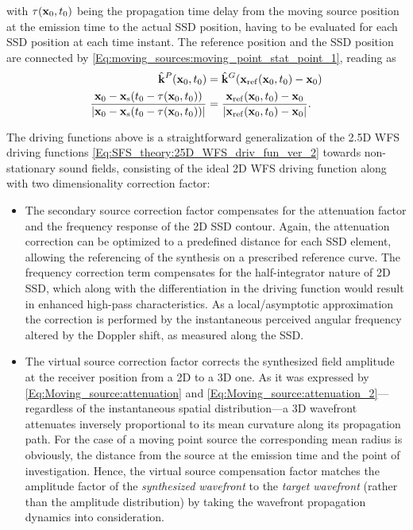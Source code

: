 with $\tau(\mathbf{x}_0,t_0)$ being the propagation time delay from the moving source position at the emission time to the actual SSD position, having to be evaluated for each SSD position at each time instant.
The reference position and the SSD position are connected by \eqref{Eq:moving_sources:moving_point_stat_point_1}, reading as
\begin{align}
\label{Eq:SFS_theory:25D_WFS_ref_point}
\hat{\mathbf{k}}^P(\mathbf{x}_0,t_0) &= \hat{\mathbf{k}}^G(\mathbf{x}_{\mathrm{ref}}(\mathbf{x}_0,t_0)-\mathbf{x}_0)
\\
\frac{\mathbf{x}_0 -\mathbf{x}_{\mathrm{s}}(t_0-\tau(\mathbf{x}_0,t_0))}{|\mathbf{x}_0-\mathbf{x}_{\mathrm{s}}(t_0 - \tau(\mathbf{x}_0,t_0))|} &=  \frac{\mathbf{x}_{\mathrm{ref}}(\mathbf{x}_0,t_0)-\mathbf{x}_0}{|\mathbf{x}_{\mathrm{ref}}(\mathbf{x}_0,t_0)-\mathbf{x}_0|}.
\end{align}

The driving functions above is a straightforward generalization of the 2.5D WFS driving functions \eqref{Eq:SFS_theory:25D_WFS_driv_fun_ver_2} towards non-stationary sound fields, consisting of the ideal 2D WFS driving function along with two dimensionality correction factor:
\begin{itemize}
\item The secondary source correction factor compensates for the attenuation factor and the frequency response of the 2D SSD contour.
Again, the attenuation correction can be optimized to a predefined distance for each SSD element, allowing the referencing of the synthesis on a prescribed reference curve.
The frequency correction term compensates for the half-integrator nature of 2D SSD, which along with the differentiation in the driving function would result in enhanced high-pass characteristics.
As a local/asymptotic approximation the correction is performed by the instantaneous perceived angular frequency altered by the Doppler shift, as measured along the SSD.
\item The virtual source correction factor corrects the synthesized field amplitude at the receiver position from a 2D to a 3D one.
As it was expressed by \eqref{Eq:Moving_source:attenuation} and \eqref{Eq:Moving_source:attenuation_2}---regardless of the instantaneous spatial distribution---a 3D wavefront attenuates inversely proportional to its mean curvature along its propagation path.
For the case of a moving point source the corresponding mean radius is obviously, the distance from the source at the emission time and the point of investigation.
Hence, the virtual source compensation factor matches the amplitude factor of the \emph{synthesized wavefront} to the \emph{target wavefront} (rather than the amplitude distribution) by taking the wavefront propagation dynamics into consideration.
\end{itemize}
